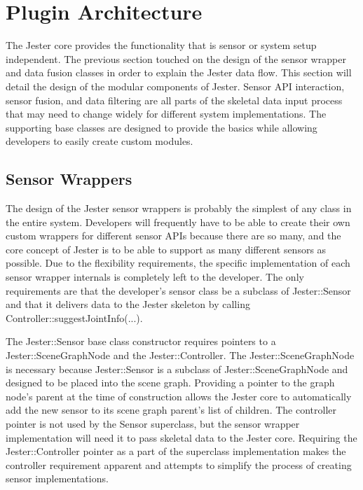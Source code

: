 \section{Plugin Architecture}

The Jester core provides the functionality that is sensor or system setup independent. The previous section touched on the design of the sensor wrapper and data fusion classes in order to explain the Jester data flow. This section will detail the design of the modular components of Jester. Sensor API interaction, sensor fusion, and data filtering are all parts of the skeletal data input process that may need to change widely for different system implementations. The supporting base classes are designed to provide the basics while allowing developers to easily create custom modules.

\subsection{Sensor Wrappers}\label{sec:sensor_wrappers}

The design of the Jester sensor wrappers is probably the simplest of any class in the entire system. Developers will frequently have to be able to create their own custom wrappers for different sensor APIs because there are so many, and the core concept of Jester is to be able to support as many different sensors as possible. Due to the flexibility requirements, the specific implementation of each sensor wrapper internals is completely left to the developer. The only requirements are that the developer's sensor class be a subclass of \mbox{Jester::Sensor} and that it delivers data to the Jester skeleton by calling \mbox{Controller::suggestJointInfo(...)}. 

The Jester::Sensor base class constructor requires pointers to a Jester::SceneGraphNode and the Jester::Controller. The Jester::SceneGraphNode is necessary because Jester::Sensor is a subclass of Jester::SceneGraphNode and designed to be placed into the scene graph. Providing a pointer to the graph node's parent at the time of construction allows the Jester core to automatically add the new sensor to its scene graph parent's list of children. The controller pointer is not used by the Sensor superclass, but the sensor wrapper implementation will need it to pass skeletal data to the Jester core. Requiring the Jester::Controller pointer as a part of the superclass implementation makes the controller requirement apparent and attempts to simplify the process of creating sensor implementations. 

